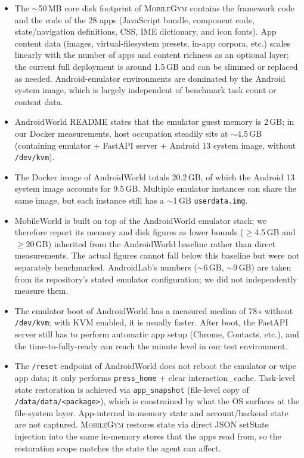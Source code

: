 \documentclass{llmxive}
\providecommand{\sys}{\textsc{MobileGym}}
\begin{document}
\begin{itemize}
  \item The $\sim$50\,MB core disk footprint of \sys{} contains the framework code and the code of the 28 apps (JavaScript bundle, component code, state/navigation definitions, CSS, IME dictionary, and icon fonts). App content data (images, virtual-filesystem presets, in-app corpora, etc.) scales linearly with the number of apps and content richness as an optional layer; the current full deployment is around 1.5\,GB and can be slimmed or replaced as needed. Android-emulator environments are dominated by the Android system image, which is largely independent of benchmark task count or content data.

  \item AndroidWorld README states that the emulator guest memory is 2\,GB; in our Docker measurements, host occupation steadily sits at $\sim$4.5\,GB (containing emulator + FastAPI server + Android 13 system image, without \texttt{/dev/kvm}).

  \item The Docker image of AndroidWorld totals 20.2\,GB, of which the Android 13 system image accounts for 9.5\,GB. Multiple emulator instances can share the same image, but each instance still has a $\sim$1\,GB \texttt{userdata.img}.

  \item MobileWorld is built on top of the AndroidWorld emulator stack; we therefore report its memory and disk figures as lower bounds ($\geq$4.5\,GB and $\geq$20\,GB) inherited from the AndroidWorld baseline rather than direct measurements. The actual figures cannot fall below this baseline but were not separately benchmarked. AndroidLab's numbers ($\sim$6\,GB, $\sim$9\,GB) are taken from its repository's stated emulator configuration; we did not independently measure them.

  \item The emulator boot of AndroidWorld has a measured median of 78\,s without \texttt{/dev/kvm}; with KVM enabled, it is usually faster. After boot, the FastAPI server still has to perform automatic app setup (Chrome, Contacts, etc.), and the time-to-fully-ready can reach the minute level in our test environment.

  \item The \texttt{/reset} endpoint of AndroidWorld does not reboot the emulator or wipe app data; it only performs \texttt{press\_home} + clear interaction\_cache. Task-level state restoration is achieved via \texttt{app\_snapshot} (file-level copy of \texttt{/data/data/<package>}), which is constrained by what the OS surfaces at the file-system layer. App-internal in-memory state and account/backend state are not captured. \sys{} restores state via direct JSON setState injection into the same in-memory stores that the apps read from, so the restoration scope matches the state the agent can affect.


\end{itemize}
\end{document}
